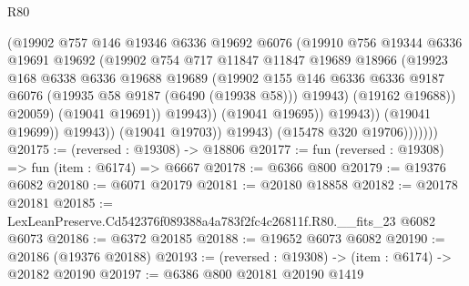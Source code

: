 \begin{lexlean}{R80}
\begin{coremodule}
                                  (@19902
                                    @757
                                    @146
                                    @19346
                                    @6336
                                    @19692
                                    @6076
                                    (@19910
                                      @756
                                      @19344
                                      @6336
                                      @19691
                                      @19692
                                      (@19902
                                        @754
                                        @717
                                        @11847
                                        @11847
                                        @19689
                                        @18966
                                        (@19923
                                          @168
                                          @6338
                                          @6336
                                          @19688
                                          @19689
                                          (@19902
                                            @155
                                            @146
                                            @6336
                                            @6336
                                            @9187
                                            @6076
                                            (@19935 @58 @9187 (@6490 (@19938 @58)))
                                            @19943)
                                          (@19162 @19688))
                                        @20059)
                                      (@19041 @19691))
                                    @19943))
                                (@19041 @19695))
                              @19943))
                          (@19041 @19699))
                        @19943))
                    (@19041 @19703))
                  @19943)
                (@15478 @320 @19706)))))))
@20175 := (reversed : @19308) -> @18806
@20177 := fun (reversed : @19308) => fun (item : @6174) => @6667
@20178 := @6366 @800
@20179 := @19376 @6082
@20180 := @6071 @20179
@20181 := @20180 @18858
@20182 := @20178 @20181
@20185 := LexLeanPreserve.Cd542376f089388a4a783f2fc4c26811f.R80.__fits_23 @6082 @6073
@20186 := @6372 @20185
@20188 := @19652 @6073 @6082
@20190 := @20186 (@19376 @20188)
@20193 := (reversed : @19308) -> (item : @6174) -> @20182 @20190
@20197 := @6386 @800 @20181 @20190 @1419

\end{coremodule}
\end{lexlean}
